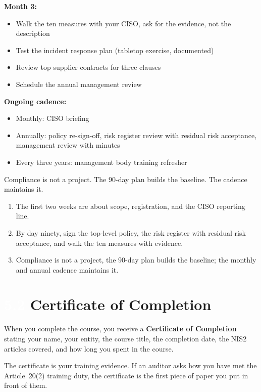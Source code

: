 \documentclass[11pt,a4paper,twoside]{book}
\newcommand{\lessontag}[1]{%
  \texorpdfstring{%
    \setlength{\fboxsep}{3pt}\colorbox{nisd2blue}{\textcolor{white}{\footnotesize\bfseries #1}}\quad%
  }{Lesson #1\ }%
}
\begin{document}
\textbf{Month 3:}
\begin{itemize}
  \item Walk the ten measures with your CISO, ask for the evidence, not the description
  \item Test the incident response plan (tabletop exercise, documented)
  \item Review top supplier contracts for three clauses
  \item Schedule the annual management review
\end{itemize}

\textbf{Ongoing cadence:}
\begin{itemize}
  \item Monthly: CISO briefing
  \item Annually: policy re-sign-off, risk register review with residual risk acceptance, management review with minutes
  \item Every three years: management body training refresher
\end{itemize}

Compliance is not a project. The 90-day plan builds the baseline. The cadence maintains it.

\begin{keytakeaways}
\begin{enumerate}
  \item The first two weeks are about scope, registration, and the CISO reporting line.
  \item By day ninety, sign the top-level policy, the risk register with residual risk acceptance, and walk the ten measures with evidence.
  \item Compliance is not a project, the 90-day plan builds the baseline; the monthly and annual cadence maintains it.
\end{enumerate}
\end{keytakeaways}

\section{\lessontag{5.2}Certificate of Completion}

When you complete the course, you receive a \textbf{Certificate of Completion} stating your name, your entity, the course title, the completion date, the NIS2 articles covered, and how long you spent in the course.

The certificate is your training evidence. If an auditor asks how you have met the Article~20(2) training duty, the certificate is the first piece of paper you put in front of them.
\end{document}
